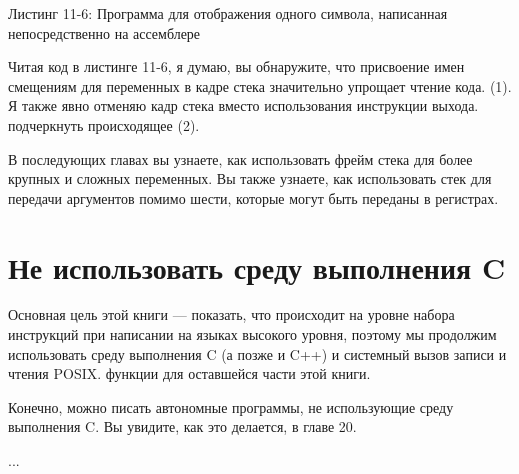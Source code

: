 \begin{center}
Листинг 11-6: Программа для отображения одного символа, написанная непосредственно на ассемблере
\end{center}

Читая код в листинге 11-6, я думаю, вы обнаружите, что присвоение имен смещениям для переменных в кадре стека значительно упрощает чтение кода. (1). Я также явно отменяю кадр стека вместо использования инструкции выхода. подчеркнуть происходящее (2).

В последующих главах вы узнаете, как использовать фрейм стека для более крупных и сложных переменных. Вы также узнаете, как использовать стек для передачи аргументов помимо шести, которые могут быть переданы в регистрах.

\section{Не использовать среду выполнения C}

Основная цель этой книги — показать, что происходит на уровне набора инструкций при написании на языках высокого уровня, поэтому мы продолжим использовать среду выполнения C (а позже и C++) и системный вызов записи и чтения POSIX. функции для оставшейся части этой книги.

Конечно, можно писать автономные программы, не использующие среду выполнения C. Вы увидите, как это делается, в главе 20.

...

